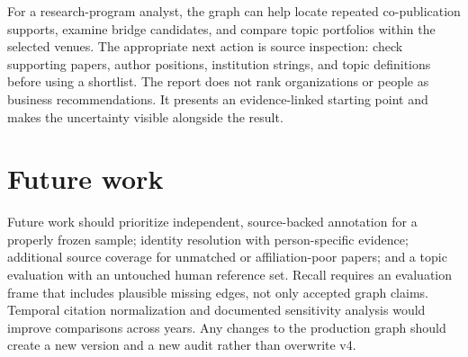 For a research-program analyst, the graph can help locate repeated
co-publication supports, examine bridge candidates, and compare topic portfolios
within the selected venues. The appropriate next action is source inspection:
check supporting papers, author positions, institution strings, and topic
definitions before using a shortlist. The report does not rank organizations or
people as business recommendations. It presents an evidence-linked starting
point and makes the uncertainty visible alongside the result.

\section{Future work}

Future work should prioritize independent, source-backed annotation for a
properly frozen sample; identity resolution with person-specific evidence;
additional source coverage for unmatched or affiliation-poor papers; and a
topic evaluation with an untouched human reference set. Recall requires an
evaluation frame that includes plausible missing edges, not only accepted graph
claims. Temporal citation normalization and documented sensitivity analysis
would improve comparisons across years. Any changes to the production graph
should create a new version and a new audit rather than overwrite v4.
